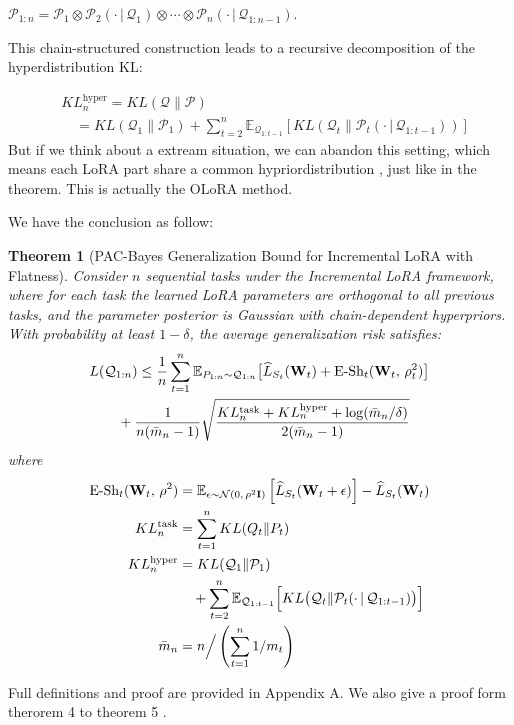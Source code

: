 \documentclass[letterpaper]{article} %
\newtheorem{theorem}{Theorem}
\begin{document}
$\mathcal{P}_{1:n} = \mathcal{P}_1 \otimes \mathcal{P}_2(\cdot\,|\,\mathcal{Q}_1) \otimes \cdots \otimes \mathcal{P}_n(\cdot\,|\,\mathcal{Q}_{1:n-1}).$

This chain-structured construction leads to a recursive decomposition of the hyperdistribution KL:

$$  
\begin{aligned}
    &KL^{\text{hyper}}_n = KL(\mathcal{Q} \| \mathcal{P})  \\
    & \quad =KL(\mathcal{Q}_1 \| \mathcal{P}_1)  +\sum_{t=2}^n \mathbb{E}_{\mathcal{Q}_{1:t-1}}\left[        KL(\mathcal{Q}_t \| \mathcal{P}_t(\cdot\,|\,\mathcal{Q}_{1:t-1}))    \right]
\end{aligned}
$$
But if we think about a extream situation, we can abandon this setting, which means each LoRA part share a common hypriordistribution , just like in the theorem. This is actually the OLoRA method.  


We have the conclusion as follow: 
\begin{theorem}[PAC-Bayes Generalization Bound for Incremental LoRA with Flatness]
Consider $n$ sequential tasks under the Incremental LoRA framework, where for each task the learned LoRA parameters are orthogonal to all previous tasks, and the parameter posterior is Gaussian with chain-dependent hyperpriors. With probability at least $1-\delta$, the average generalization risk satisfies:
\begin{align}
      &  L(\mathcal{Q}_{1:n}) \leq  \frac{1}{n} \sum_{t=1}^{n}
        \mathbb{E}_{P_{1:n} \sim \mathcal{Q}_{1:n}}\big[
            \widehat{L}_{S_t}(\mathbf{W}_{t}) \notag
 + \text{E-Sh}_t(\mathbf{W}_{t} ,\, \rho_t^2)
        \big] \notag\\
&  \qquad + \frac{1 }{n(\bar{m}_n - 1)}\sqrt{
            \frac{KL_{n}^{\text{task}} + KL_{n}^{\text{hyper}} +\log(\bar{m}_{n}/\delta)}{2(\bar{m}_{n} - 1)}
        }
\end{align}
where
\begin{align}
\text{E-Sh}_t(\mathbf{W}_{t},\, \rho^2) 
    &= \mathbb{E}_{\epsilon \sim \mathcal{N}(0,\, \rho^2 \mathbf{I})} 
        \left[
            \widehat{L}_{S_t}(\mathbf{W}_{t}  + \epsilon)
        \right] 
        - \widehat{L}_{S_t}(\mathbf{W}_{t} ) \notag\\
KL^{\text{task}}_n &= \sum_{t=1}^n KL(Q_t \| P_t) \notag \\
KL^{\text{hyper}}_n &= KL(\mathcal{Q}_1 \| \mathcal{P}_1) \notag \\
   &\quad + \sum_{t=2}^n 
        \mathbb{E}_{\mathcal{Q}_{1:t-1}} \Big[
            KL\big(\mathcal{Q}_t \| \mathcal{P}_t(\cdot\,|\,\mathcal{Q}_{1:t-1})\big)
        \Big] \notag\\
\bar{m}_n &= n \Big/ \left(\sum_{t=1}^n 1/m_t\right) \notag
\end{align}
\end{theorem}
Full definitions and proof are provided in Appendix A. We also give a proof form therorem 4 to theorem 5 .
\end{document}

